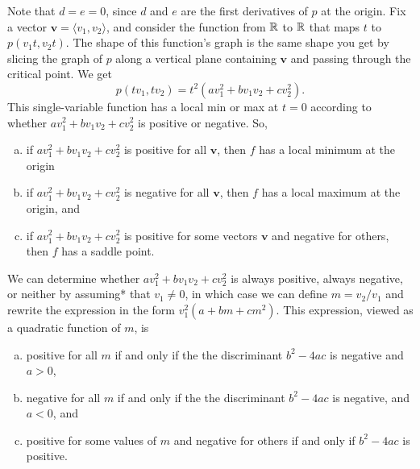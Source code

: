 \documentclass{watsonbook}
\begin{document}
\begin{pf}
    Note that $d=e=0$, since $d$ and $e$ are the first derivatives of
    $p$ at the origin.  Fix a vector
    $\mathbf{v} = \langle v_1, v_2 \rangle$, and consider the function
    from $\mathbb{R}$ to $\mathbb{R}$ that maps $t$ to $p(v_1t, v_2 t)$. The shape of
    this function's graph is the same shape you get by slicing the
    graph of $p$ along a vertical plane containing $\mathbf{v}$ and
    passing through the critical point. We get
    \begin{equation} \label{eq:ptv}
      p(t v_1, t v_2) = t^2(av_1^2 + bv_1 v_2 + c v_2^2). 
    \end{equation}
    This single-variable function has a local min or max at $t=0$
    according to whether $av_1^2 + b v_1v_2 + c v_2^2$ is positive or
    negative. So,
    \begin{enumerate}[(a),itemsep = 4 pt, topsep = -6pt]
    \item if $av_1^2 + b v_1v_2 + c v_2^2$ is positive for all
      $\mathbf{v}$, then $f$ has a local minimum at the origin
    \item if $av_1^2 + b v_1v_2 + c v_2^2$ is negative for all
      $\mathbf{v}$, then $f$ has a local maximum at the origin, and
    \item if $av_1^2 + b v_1v_2 + c v_2^2$ is positive for some vectors
      $\mathbf{v}$ and negative for others, then $f$ has a saddle point.
    \end{enumerate}
     We can determine whether
    $av_1^2 + b v_1v_2 + c v_2^2$ is always positive, always negative,
    or neither by assuming* that $v_1 \neq 0$, in which case we can
    define $m = v_2/v_1$ and rewrite the expression in the form
    $v_1^2(a + bm + cm^2)$. This expression, viewed as a quadratic
    function of $m$, is
    \begin{enumerate}[(a), topsep = -6pt, itemsep = 4pt]
      \item positive for all $m$ if and only if the the discriminant
        $b^2 - 4ac$ is negative and $a > 0$,
      \item negative for all $m$ if and only if the the discriminant
        $b^2 - 4ac$ is negative, and $a < 0$, and
      \item positive for some values of $m$ and negative for
        others if and only if $b^2 - 4ac$ is positive.
      \end{enumerate}
     

\end{pf}
\end{document}
